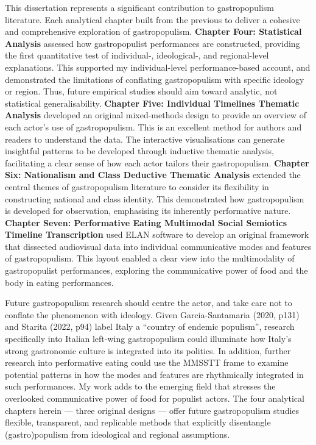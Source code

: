 \documentclass[a4paper, nobind]{templates/ociamthesis}
\begin{document}
This dissertation represents a significant contribution to gastropopulism literature. Each analytical chapter built from the previous to deliver a cohesive and comprehensive exploration of gastropopulism. \textbf{Chapter Four: Statistical Analysis} assessed how gastropopulist performances are constructed, providing the first quantitative test of individual-, ideological-, and regional-level explanations. This supported my individual-level performance-based account, and demonstrated the limitations of conflating gastropopulism with specific ideology or region. Thus, future empirical studies should aim toward analytic, not statistical generalisability. \textbf{Chapter Five: Individual Timelines Thematic Analysis} developed an original mixed-methods design to provide an overview of each actor's use of gastropopulism. This is an excellent method for authors and readers to understand the data. The interactive visualisations can generate insightful patterns to be developed through inductive thematic analysis, facilitating a clear sense of how each actor tailors their gastropopulism. \textbf{Chapter Six: Nationalism and Class Deductive Thematic Analysis} extended the central themes of gastropopulism literature to consider its flexibility in constructing national and class identity. This demonstrated how gastropopulism is developed for observation, emphasising its inherently performative nature. \textbf{Chapter Seven: Performative Eating Multimodal Social Semiotics Timeline Transcription} used ELAN software to develop an original framework that dissected audiovisual data into individual communicative modes and features of gastropopulism. This layout enabled a clear view into the multimodality of gastropopulist performances, exploring the communicative power of food and the body in eating performances.

Future gastropopulism research should centre the actor, and take care not to conflate the phenomenon with ideology. Given Garcia-Santamaria (2020, p131) and Starita (2022, p94) label Italy a ``country of endemic populism'', research specifically into Italian left-wing gastropopulism could illuminate how Italy's strong gastronomic culture is integrated into its politics. In addition, further research into performative eating could use the MMSSTT frame to examine potential patterns in how the modes and features are rhythmically integrated in such performances. My work adds to the emerging field that stresses the overlooked communicative power of food for populist actors. The four analytical chapters herein --- three original designs --- offer future gastropopulism studies flexible, transparent, and replicable methods that explicitly disentangle (gastro)populism from ideological and regional assumptions.
\end{document}
